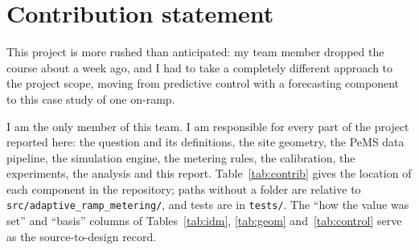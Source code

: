 \documentclass[11pt,letterpaper]{article}
\begin{document}
\appendix
\section{Contribution statement}

This project is more rushed than anticipated: my team member dropped the course about a
week ago, and I had to take a completely different approach to the project scope,
moving from predictive control with a forecasting component to this case study of one
on-ramp.

I am the only member of this team. I am responsible for every part of the project
reported here: the question and its definitions, the site geometry, the PeMS data
pipeline, the simulation engine, the metering rules, the calibration, the experiments,
the analysis and this report. Table~\ref{tab:contrib} gives the location of each
component in the repository; paths without a folder are relative to
\texttt{src/adaptive\_ramp\_metering/}, and tests are in \texttt{tests/}. The ``how the
value was set'' and ``basis'' columns of Tables~\ref{tab:idm}, \ref{tab:geom}
and~\ref{tab:control} serve as the source-to-design record.
\end{document}
